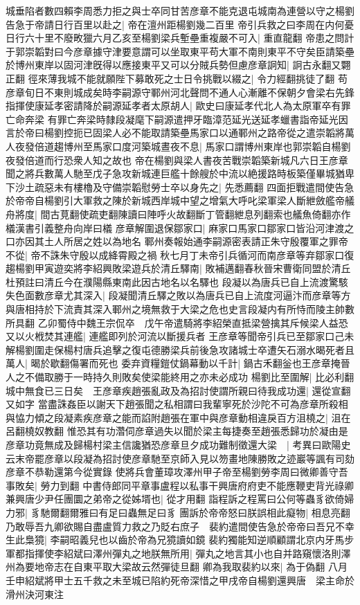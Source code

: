 城垂陷者數四賴李周悉力拒之與士卒同甘苦彦章不能克退屯城南為連營以守之楊劉告急于帝請日行百里以赴之|{
	帝在澶州距楊劉幾二百里}
帝引兵救之曰李周在内何憂日行六十里不廢畋獵六月乙亥至楊劉梁兵塹壘重複嚴不可入|{
	重直龍翻}
帝患之問計于郭崇韜對曰今彦章據守津要意謂可以坐取東平苟大軍不南則東平不守矣臣請築壘於博州東岸以固河津旣得以應接東平又可以分賊兵勢但慮彦章詗知|{
	詗古永翻又翾正翻}
徑來薄我城不能就願陛下募敢死之士日令挑戰以綴之|{
	令力經翻挑徒了翻}
苟彦章旬日不東則城成矣時李嗣源守鄆州河北聲問不通人心漸離不保朝夕會梁右先鋒指揮使康延孝密請降於嗣源延孝者太原胡人|{
	歐史曰康延孝代北人為太原軍卒有罪亡命奔梁}
有罪亡奔梁時隸段凝麾下嗣源遣押牙臨漳范延光送延孝蠟書詣帝延光因言於帝曰楊劉控扼已固梁人必不能取請築壘馬家口以通鄆州之路帝從之遣崇韜將萬人夜發倍道趨博州至馬家口度河築城晝夜不息|{
	馬家口謂博州東岸也郭崇韜自楊劉夜發倍道而行恐衆人知之故也}
帝在楊劉與梁人書夜苦戰崇韜築新城凡六日王彦章聞之將兵數萬人馳至戊子急攻新城連巨艦十餘艘於中流以絶援路時板築僅畢城猶卑下沙土疏惡未有樓櫓及守備崇韜慰勞士卒以身先之|{
	先悉薦翻}
四面拒戰遣間使告急於帝帝自楊劉引大軍救之陳於新城西岸城中望之增氣大呼叱梁軍梁人斷紲斂艦帝艤舟將度|{
	間古莧翻使疏吏翻陳讀曰陣呼火故翻斷丁管翻紲息列翻索也艤魚倚翻亦作檥漢書引義整舟向岸曰檥}
彦章解圍退保鄒家口|{
	麻家口馬家口鄒家口皆沿河津渡之口亦因其土人所居之姓以為地名}
鄆州奏報始通李嗣源密表請正朱守殷覆軍之罪帝不從|{
	帝不誅朱守殷以成絳霄殿之禍}
秋七月丁未帝引兵循河而南彦章等弃鄒家口復趨楊劉甲寅遊奕將李紹興敗梁遊兵於清丘驛南|{
	敗補邁翻春秋晉宋曹衛同盟於清丘杜預註曰清丘今在濮陽縣東南此因古地名以名驛也}
段凝以為唐兵已自上流渡驚駭失色面數彦章尤其深入|{
	段凝聞清丘驛之敗以為唐兵已自上流度河逼汴而彦章等方與唐相持於下流責其深入鄆州之境無救于大梁之危也史言段凝内有所恃而陵主帥數所具翻}
乙卯蜀侍中魏王宗侃卒　戊午帝遣騎將李紹榮直抵梁營擒其斥候梁人益恐又以火栰焚其連艦|{
	連艦即列於河流以斷援兵者}
王彦章等聞帝引兵已至鄒家口己未解楊劉圍走保楊村唐兵追擊之復屯德勝梁兵前後急攻諸城士卒遭矢石溺水暍死者且萬人|{
	暍於歇翻傷署而死也}
委弃資糧鎧仗鍋幕動以千計|{
	鍋古禾翻釡也王彦章掩晉人之不備取勝于一時持久則敗矣使梁能終用之亦未必成功}
楊劉比至圍解|{
	比必利翻}
城中無食已三日矣　王彦章疾趙張亂政及為招討使謂所親曰待我成功還|{
	還從宣翻又如字}
當盡誅姦臣以謝天下趙張聞之私相謂曰我輩寧死於沙陀不可為彦章所殺相與恊力傾之段凝素疾彦章之能而諂附趙張在軍中與彦章動相違戾百方沮橈之|{
	沮在呂翻橈奴教翻}
惟恐其有功濳伺彦章過失以聞於梁主每捷奏至趙張悉歸功於凝由是彦章功竟無成及歸楊村梁主信讒猶恐彦章旦夕成功難制徵還大梁　|{
	考異曰歐陽史云末帝罷彦章以段凝為招討使彦章馳至京師入見以笏畫地陳勝敗之迹巖等諷有司劾彦章不恭勒還第今從實錄}
使將兵會董璋攻澤州甲子帝至楊劉勞李周曰微卿善守吾事敗矣|{
	勞力到翻}
中書侍郎同平章事盧程以私事干興唐府府吏不能應鞭吏背光祿卿兼興唐少尹任團圜之弟帝之從姊壻也|{
	從才用翻}
詣程訴之程罵曰公何等蟲豸欲倚婦力邪|{
	豸馳爾翻爾雅曰有足曰蟲無足曰豸}
團訴於帝帝怒曰朕誤相此癡物|{
	相息亮翻}
乃敢辱吾九卿欲賜自盡盧質力救之乃貶右庶子　裴約遣間使告急於帝帝曰吾兄不幸生此梟獍|{
	李嗣昭義兒也以齒於帝為兄獍讀如鏡}
裴約獨能知逆順顧謂北京内牙馬步軍都指揮使李紹斌曰澤州彈丸之地朕無所用|{
	彈丸之地言其小也自并路窺懷洛則澤州為要地帝志在自東平取大梁故云然彈徒旦翻}
卿為我取裴約以來|{
	為于偽翻}
八月壬申紹斌將甲士五千救之未至城已陷約死帝深惜之甲戌帝自楊劉還興唐　梁主命於滑州決河東注

